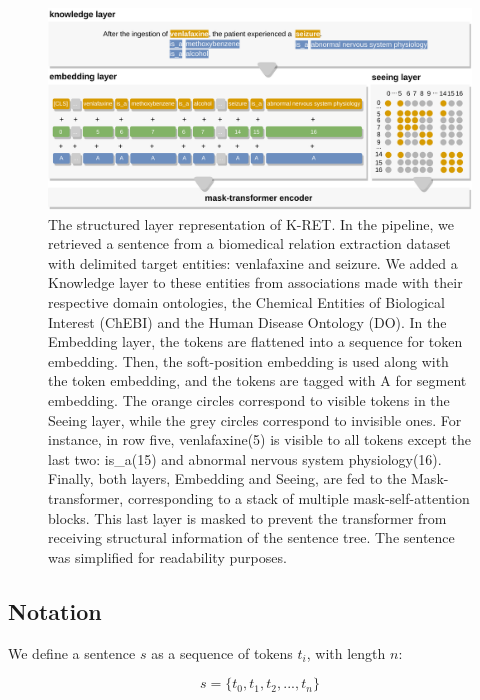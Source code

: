 \begin{figure}[hbt!]
\centerline{\includegraphics[width=\linewidth]{images/chapter_5/kret_methodology.png}}
\caption[Structured Layer Representation of K-RET]{The structured layer representation of K-RET. In the pipeline, we retrieved a sentence from a biomedical relation extraction dataset with delimited target entities: venlafaxine and seizure. We added a Knowledge layer to these entities from associations made with their respective domain ontologies, the Chemical Entities of Biological Interest (ChEBI) and the Human Disease Ontology (DO). In the Embedding layer, the tokens are flattened into a sequence for token embedding. Then, the soft-position embedding is used along with the token embedding, and the tokens are tagged with A for segment embedding. The orange circles correspond to visible tokens in the Seeing layer, while the grey circles correspond to invisible ones. For instance, in row five, venlafaxine(5) is visible to all tokens except the last two: is\_a(15) and abnormal nervous system physiology(16). Finally, both layers, Embedding and Seeing, are fed to the Mask-transformer, corresponding to a stack of multiple mask-self-attention blocks. This last layer is masked to prevent the transformer from receiving structural information of the sentence tree. The sentence was simplified for readability purposes.}\label{fig:51}
\end{figure}

\subsection{Notation}

We define a sentence $s$ as a sequence of tokens $t_{i}$, with length $n$:

\begin{equation}
s = \{t_{0}, t_{1}, t_{2}, ..., t_{n}\}\label{eq:01}
\end{equation}

